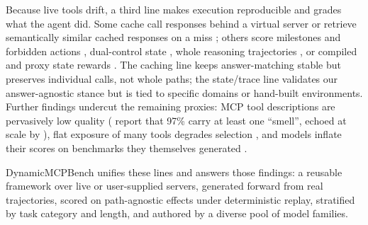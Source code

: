 Because live tools drift, a third line makes execution reproducible and grades
what the agent did. Some cache call responses behind a virtual server
\citep{guo2024stabletoolbench, guo2025stabletoolbench} or retrieve semantically
similar cached responses on a miss \citep{cheng2025travelbench}; others score
milestones and forbidden actions \citep{lu2025toolsandbox}, dual-control state
\citep{barres2025tau}, whole reasoning trajectories \citep{kim2025beyond}, or
compiled and proxy state rewards \citep{zeng2026logigen, chuang2026toward}. The
caching line keeps answer-matching stable but preserves individual calls, not
whole paths; the state/trace line validates our answer-agnostic stance but is
tied to specific domains or hand-built environments. Further findings undercut
the remaining proxies: MCP tool descriptions are pervasively low quality
(\citet{hasan2026model} report that 97\% carry at least one ``smell'', echoed at
scale by \citet{wang2026docs}), flat exposure of many tools degrades selection
\citep{gan2025rag}, and models inflate their scores on benchmarks they
themselves generated \citep{yuan2026silencer}.

DynamicMCPBench unifies these lines and answers those findings: a reusable
framework over live or user-supplied servers, generated forward from real
trajectories, scored on path-agnostic effects under deterministic replay,
stratified by task category and length, and authored by a diverse pool of model
families.
